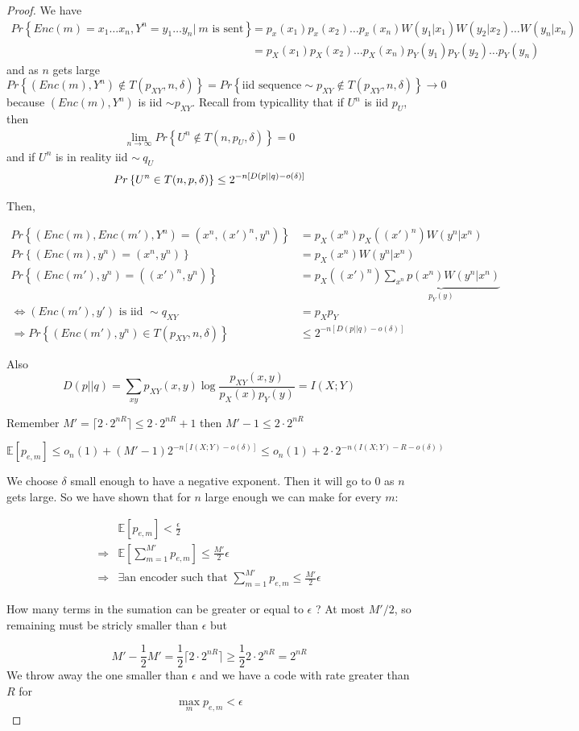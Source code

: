 \documentclass[twoside]{article}
\theoremstyle{definition} %
\renewcommand{\Pr}[1]{Pr\left\{#1\right\}}
\newcommand{\Ex}[1]{\mathbb{E}\left[#1\right]}
\begin{document}
\begin{proof}
  We have
  \begin{align*}
    \Pr{Enc(m) = x_1\dots x_n, Y^n=y_1 \dots y_n |~m \text{ is sent}}
    &= p_x(x_1)p_x(x_2)\dots p_x(x_n)W(y_1|x_1)W(y_2|x_2) \dots W(y_n|x_n) \\
    &= p_X(x_1)p_X(x_2)\dots p_X(x_n)p_Y(y_1)p_Y(y_2)\dots p_Y(y_n)
  \end{align*}
  and as $n$ gets large
  \[
    \Pr{(Enc(m), Y^n) \not \in T (p_{XY}, n, \delta)} = \Pr{\text{iid sequence} \sim p_{XY} \not \in T(p_{XY}, n, \delta)} \to 0
  \]
because $(Enc(m), Y^n)$ is iid $\sim p_{XY}$. Recall from typicallity that if $U^n$ is iid $p_U$, then
\begin{align*}
  \lim_{n\to\infty} \Pr{U^n \not \in T(n, p_U, \delta)} = 0
\end{align*}
and if $U^n$ is in reality iid $\sim~q_U$
\[
  \Pr{U^n \in T(n,p,\delta)} \leq 2^{-n[D(p||q) - o(\delta)]}\\
\]

Then,

\begin{align*}
  \Pr{(Enc(m), Enc(m'), Y^n) = (x^n, (x')^n, y^n)} &= p_X(x^n) p_X((x')^n)W(y^n|x^n)\\
  \Pr{(Enc(m), y^n) = (x^n, y^n)} &= p_X(x^n)W(y^n|x^n)\\
  \Pr{(Enc(m'), y^n) = ((x')^n, y^n)} &= p_X((x')^n) \underbrace{\sum_{x^n} p(x^n)W(y^n|x^n)}_{p_Y(y)}\\
  \iff (Enc(m'), y') \text{ is iid } \sim q_{XY} &= p_Xp_Y\\
  \Rightarrow \Pr{(Enc(m'), y^n) \in T(p_{XY}, n, \delta)} &\leq 2^{-n[D(p||q)- o(\delta)]}
\end{align*}

Also
\[
  D(p||q) = \sum_{xy} p_{XY}(x,y) \log \frac {p_{XY}(x,y)} {p_X(x) p_Y(y)} = I(X;Y)
\]


Remember $M' = \lceil2 \cdot 2^{nR} \rceil \leq 2 \cdot 2^{nR} + 1$ then $M'-1 \leq 2 \cdot 2^{nR}$

\[
  \Ex{p_{e,m}} \leq o_n(1) + (M' -1)  2^{-n[I(X;Y)- o(\delta)]}
  \leq o_n(1) + 2 \cdot 2^{-n(I(X;Y) - R - o(\delta))}
\]

We choose $\delta$ small enough to have a negative exponent. Then it will go to 0 as $n$ gets large. So we have shown that for $n $ large enough we can make for every $m$:

\begin{align*}
  &\Ex{p_{e,m}} < \frac \epsilon 2\\
  \Rightarrow& \Ex{\sum_{m=1}^{M'} p_{e,m}} \leq \frac{M'} 2 \epsilon\\
  \Rightarrow& \exists \text{an encoder such that } \sum_{m=1}^{M'} p_{e,m} \leq \frac{M'} 2 \epsilon
\end{align*}

How many terms in the sumation can be greater or equal to $\epsilon$ ? At most $M'/2$, so remaining must be stricly smaller than $\epsilon$ but

\[
  M' - \frac 1 2 M' = \frac 1 2 \lceil 2 \cdot 2^{nR} \rceil \geq \frac 1 2 2 \cdot 2^{nR} = 2^{nR}
\]
We throw away the one smaller than $\epsilon$ and we have a code with rate greater than $R$ for
\[
  \max_m p_{e,m} < \epsilon
\]
\end{proof}
\end{document}
